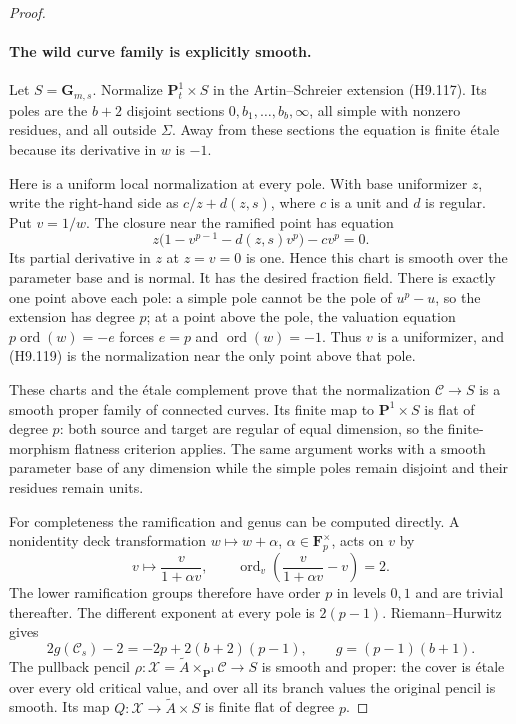 \begin{proof}
\paragraph{The wild curve family is explicitly smooth.}
Let $S=\mathbf G_{m,s}$. Normalize
$\mathbf P^1_t\times S$ in the Artin--Schreier extension
(H9.117). Its poles are the $b+2$ disjoint sections
$0,b_1,\ldots,b_b,\infty$, all simple with nonzero
residues, and all outside $\Sigma$. Away from these
sections the equation is finite \'etale because its
derivative in $w$ is $-1$.

Here is a uniform local normalization at every pole.
With base uniformizer $z$, write the right-hand side as
$c/z+d(z,s)$, where $c$ is a unit and $d$ is regular.
Put $v=1/w$. The closure near the ramified point has
equation
\[
       z\bigl(1-v^{p-1}-d(z,s)v^p\bigr)-c v^p=0.
                                                               \tag{H9.119}
\]
Its partial derivative in $z$ at $z=v=0$ is one. Hence
this chart is smooth over the parameter base and is
normal. It has the desired fraction field. There is
exactly one point above each pole: a simple pole cannot
be the pole of $u^p-u$, so the extension has degree $p$;
at a point above the pole, the valuation equation
$p\operatorname{ord}(w)=-e$ forces $e=p$ and
$\operatorname{ord}(w)=-1$. Thus $v$ is a uniformizer,
and (H9.119) is the normalization near the only point
above that pole.

These charts and the \'etale complement prove that the
normalization $\mathscr C\to S$ is a smooth proper
family of connected curves. Its finite map to
$\mathbf P^1\times S$ is flat of degree $p$: both
source and target are regular of equal dimension, so
the finite-morphism flatness criterion applies.
The same argument works with a smooth parameter base
of any dimension while the simple poles remain
disjoint and their residues remain units.

For completeness the ramification and genus can be
computed directly. A nonidentity deck transformation
$w\mapsto w+\alpha$, $\alpha\in\mathbf F_p^\times$,
acts on $v$ by
\[
 v\longmapsto\frac{v}{1+\alpha v},\qquad
 \operatorname{ord}_v\left(\frac{v}{1+\alpha v}-v\right)=2.
\]
The lower ramification groups therefore have order
$p$ in levels $0,1$ and are trivial thereafter. The
different exponent at every pole is $2(p-1)$.
Riemann--Hurwitz gives
\[
 2g(\mathscr C_s)-2=-2p+2(b+2)(p-1),
                      \qquad g=(p-1)(b+1).
\]
The pullback pencil
$\rho:\mathscr X=\widetilde A\times_{\mathbf P^1}\mathscr C\to S$
is smooth and proper: the cover is \'etale over every
old critical value, and over all its branch values
the original pencil is smooth. Its map
$Q:\mathscr X\to\widetilde A\times S$ is finite flat
of degree $p$.


\end{proof}
